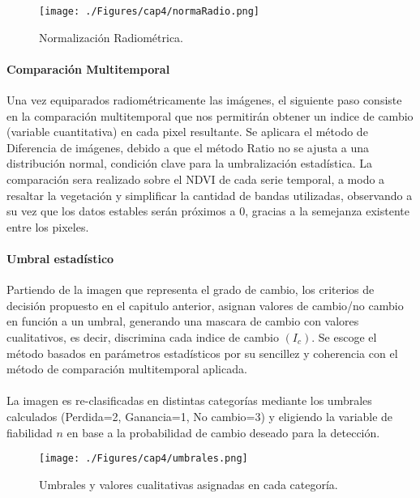 	\begin{figure}[H]
		\centering
		\texttt{[image: ./Figures/cap4/normaRadio.png]}
		\caption{Normalizaci\'on Radiom\'etrica.}
		\label{fig:normRadio}
	\end{figure}
	
	
\paragraph{Comparaci\'on Multitemporal}
Una vez equiparados radiom\'etricamente las im\'agenes, el siguiente paso consiste en la comparaci\'on multitemporal que nos permitir\'an obtener un indice de cambio (variable cuantitativa) en cada pixel resultante. Se aplicara el m\'etodo de Diferencia de im\'agenes, debido a que el m\'etodo Ratio no se ajusta a una distribuci\'on normal, condici\'on clave para la umbralizaci\'on estad\'istica. La comparaci\'on sera realizado sobre el NDVI de cada serie temporal, a modo a resaltar la vegetaci\'on y simplificar la cantidad de bandas utilizadas, observando a su vez que los datos estables ser\'an pr\'oximos a 0, gracias a la semejanza existente entre los pixeles. 
\paragraph{Umbral estad\'istico}
Partiendo de la imagen que representa el grado de cambio, los criterios de decisi\'on propuesto en el capitulo anterior, asignan valores de cambio/no cambio en funci\'on a un umbral, generando una mascara de cambio con valores cualitativos, es decir, discrimina cada indice de cambio $ (I_{c}) $. Se escoge el m\'etodo basados en par\'ametros estad\'isticos por su sencillez y coherencia con el m\'etodo de comparaci\'on multitemporal aplicada. \\~\\
La imagen es re-clasificadas en distintas categor\'ias mediante los umbrales calculados (Perdida=2, Ganancia=1, No cambio=3) y eligiendo la variable de fiabilidad $ n $ en base a la probabilidad de cambio deseado para la detecci\'on.
	\begin{figure}[H]
		\centering
		\texttt{[image: ./Figures/cap4/umbrales.png]}
		\caption{Umbrales y valores cualitativas asignadas en cada categor\'ia.}
		\label{fig:umbrales}
	\end{figure}
